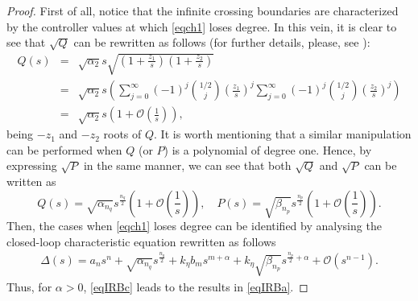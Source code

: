 \documentclass[twoside,reqno,11pt]{fcaa-var} %
\begin{document}
\begin{proof}
		First of all, notice that the infinite crossing boundaries are characterized by the controller values at which \eqref{eqch1} loses degree. %
		In this vein, it is clear to see that $\sqrt{Q}$ can be rewritten as follows (for further details, please, see \cite{Goss2014}):
	\begin{eqnarray*}
		Q(s)&=&\sqrt{\alpha_2}s\sqrt{(1+\tfrac{z_1}{s})(1+\tfrac{z_2}{s})}\\ 
		&=&\sqrt{\alpha_2}s\left(\sum_{j=0}^{\infty}\left.(-1)^j\binom{1/2}{j}(\tfrac{z_1}{s})^j\sum_{j=0}^{\infty}(-1)^j\binom{1/2}{j}(\tfrac{z_2}{s})^j\right)\right.\\ 
		&=&\sqrt{\alpha_2}s\left(1+\mathcal{O}\left(\frac{1}{s}\right)\right),
	\end{eqnarray*}
	being $-z_1$ and $-z_2$ roots of $Q$. It is worth mentioning that a similar manipulation can be performed when $Q$ (or $P$) is a polynomial of degree one.
	Hence, by expressing $\sqrt{P}$
	in the same manner, we can see that both $\sqrt{Q}$ and $\sqrt{P}$ can be written as
	\begin{equation}
	Q(s)=\sqrt{\alpha_{n_q}}s^{\frac{n_q}{2}}\left(1+\mathcal{O}\left(\frac{1}{s}\right)\right), \quad P(s)=\sqrt{\beta_{n_p}}s^{\frac{n_p}{2}}\left(1+\mathcal{O}\left(\frac{1}{s}\right)\right). \label{eqqpa}
	\end{equation}
	Then, the cases when \eqref{eqch1} loses degree can be identified by analysing the closed-loop characteristic equation rewritten as follows
	\begin{multline}
		\Delta(s)=a_ns^n+\sqrt{\alpha_{n_q}}s^{\frac{n_q}{2}}+k_{\eta}b_ms^{m+\alpha}+k_{\eta}\sqrt{\beta_{n_p}}s^{\frac{n_p}{2}+\alpha} +\mathcal{O}\left(s^{n-1}\right). \label{eqIRBc}
	\end{multline}
	Thus, for $\alpha>0$, \eqref{eqIRBc} leads to the results in \eqref{eqIRBa}. %

\end{proof}
\end{document}
